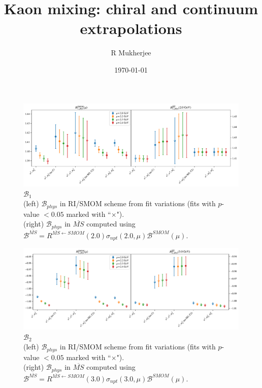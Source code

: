 \documentclass[12pt]{extarticle}
\title{Kaon mixing: chiral and continuum extrapolations}
\author{R Mukherjee}
\date{\today}
\begin{document}
\maketitle
\tableofcontents
\clearpage
\begin{figure}
\centering
\includegraphics[page=1, width=1.1\textwidth]{VVpAA/NPR/fit_summary_bag.pdf}
\caption{$\mathcal{B}_{1}$\\(left) $\mathcal{B}_{phys}$ in RI/SMOM scheme from fit variations (fits with $p$-value $<0.05$ marked with ``$\times$"). \\(right) $\mathcal{B}_{phys}$ in $\overline{MS}$ computed using $\mathcal{B}^{\overline{MS}} = R^{\overline{MS}\leftarrow SMOM}(2.0)\sigma_{npt}(2.0,\mu) \mathcal{B}^{SMOM}(\mu)$.}
\end{figure}
\clearpage
\begin{figure}
\centering
\includegraphics[page=1, width=1.1\textwidth]{VVmAA/NPR/fit_summary_bag.pdf}
\caption{$\mathcal{B}_{2}$\\(left) $\mathcal{B}_{phys}$ in RI/SMOM scheme from fit variations (fits with $p$-value $<0.05$ marked with ``$\times$"). \\(right) $\mathcal{B}_{phys}$ in $\overline{MS}$ computed using $\mathcal{B}^{\overline{MS}} = R^{\overline{MS}\leftarrow SMOM}(3.0)\sigma_{npt}(3.0,\mu) \mathcal{B}^{SMOM}(\mu)$.}
\end{figure}
\clearpage
\end{document}

